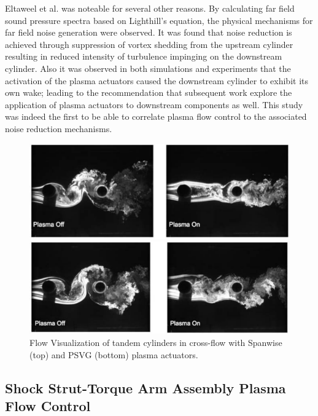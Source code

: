 Eltaweel et al. was noteable for several other reasons. By calculating far field sound pressure spectra based on Lighthill's equation, the physical mechanisms for far field noise generation were observed. It was found that noise reduction is achieved through suppression of vortex shedding from the upstream cylinder resulting in reduced intensity of turbulence impinging on the downstream cylinder. Also it was observed in both simulations and experiments that the activation of the plasma actuators caused the downstream cylinder to exhibit its own wake; leading to the recommendation that subsequent work explore the application of plasma actuators to downstream components as well. This study was indeed the first to be able to correlate plasma flow control to the associated noise reduction mechanisms.

\begin{figure}
	\begin{center}
		\centerline{\includegraphics[scale=1.0]{figures/tandem_span}}
		\centerline{\includegraphics[scale=1.0]{figures/tandem_psvg}}
		\caption{Flow Visualization of tandem cylinders in cross-flow with Spanwise (top) and PSVG (bottom) plasma actuators.}
		\label{fig:cyl2}
	\end{center}
\end{figure}

\subsection{Shock Strut-Torque Arm Assembly Plasma Flow Control}

